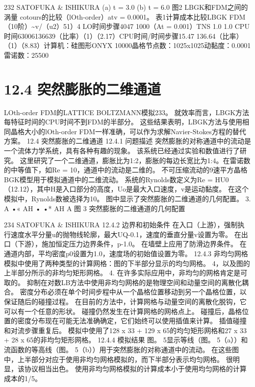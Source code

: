 \documentclass[UTF8,11pt,a4paper,openany,fontset=fandol]{ctexbook}
\begin{document}
232 SATOFUKA \& ISHIKURA (a) t = 3.0 (b) t = 6.0 图2 LBGK和FDM之间的涡量 cotours的比较（lOth-order）atv = 0.0001。 表1计算成本比较LBGK FDM（10阶）\textasciitilde{}v/（u2）51）4 LO时间步骤4047 1000（At = 0.001）TNS 1.0 1.0 CPU时间63006136639（比率）（1）（2.17）CPU时间/时间步骤15.47 136.64（比率）（1）（8.83）计算机：硅图形ONYX 10000晶格节点数：1025x1025动黏度：0.0001 雷诺数：25500

\section{12.4 突然膨胀的二维通道}
LOth-order FDM的LATTICE BOLTZMANN模拟233。 就效率而言，LBGK方法每特征时间的CPU时间不到FDM的半部分。 这些结果表明，LBGK方法与使用相同晶格大小的lOth-order FDM一样准确，可以作为求解Navier-Stokes方程的替代方案。 12.4 突然膨胀的二维通道 12.4.1 问题描述 突然膨胀的对称通道中的流动是一个流体力学系统，具有各种有趣的现象。 该系统已经通过实验和数值进行了研究。 这里研究了一个二维通道，膨胀比为1:2，膨胀的每边长宽比为1:4。在雷诺数的中等值下，如Re = 10，通道中的流动是二维的。 不可压缩流动的9速平方晶格BGK模型用于模拟通道中的二维流动。 系统的Rynolds数定义为Re = HU0（12.12），其中H是入口部分的高度，Uo是最大入口速度，v是运动黏度。 在这个模拟中，Rynolds数被选择为10。 图中显示了突然膨胀的二维通道的几何配置。 3. A •« AH • •* AH A 图 3 突然膨胀的二维通道的几何配置

234 SATOFUKA \& ISHIKURA 12.4.2 边界和初始条件 在入口（上游），强制执行速度水平分量u的抛物线轮廓，最大UQ-0.1，速度的垂直分量v设置为零。 在出口（下游），施加恒定压力边界条件，p-1.0。 在墙壁上应用了防滑边界条件。 在通道内部，平均密度p0设置为1.0，速度场的初始值设置为零。 12.4.3 非均匀网格 模拟中使用了两种类型的计算网格：图的下半部分显示的均匀网格。 4，以及图的上半部分所示的非均匀矩形网格。 4. 在许多实际应用中，非均匀的网格肯定是可取的。 抑制在对数LB方法中使用非均匀网格的是物理空间和动量空间的离散化耦合。 密度分布必须在单个时间步程中从一个晶格位置移动到另一个晶格位置，以保证随后的碰撞过程。 在目前的方法中，计算网格与动量空间的离散化脱钩，它可以有一个任意的形状。 碰撞仍然发生在计算网格的网格点上。 碰撞后，晶格位置的密度分布现在可能无法准确确定，它们始终可以使用插值来计算。 插值碰撞和对流步骤重复后。 模拟中使用了128 x 33 + 129 x 65的均匀矩形网格和27 x 33 + 28 x 65的非均匀矩形网格。 12.4.4 模拟结果 图。 5显示等线（图。 5（a））和流函数的等高线（图。 5（b））用于突然膨胀的对称通道中的流动。 在这些图中，上半部分对应于使用非均匀网格模拟的，而下半部分表示均匀网格。 很明显，该协议相当出色。 使用非均匀网格模拟的计算成本小于使用均匀网格的计算成本的1/5。
\end{document}

